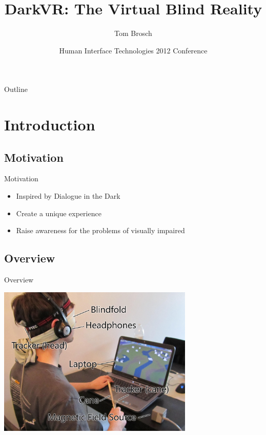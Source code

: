 \documentclass{beamer}
\title{DarkVR: The Virtual Blind Reality}
\author{Tom Brosch}
\institute[Universities of British Columbia]
{
Electrical and Computer Engineering\\
University of British Columbia
}
\date{Human Interface Technologies 2012 Conference}
\begin{document}
\begin{frame}
\titlepage
\end{frame}

\begin{frame}{Outline}
\tableofcontents
\end{frame}


\section{Introduction}

\subsection{Motivation}

\begin{frame}{Motivation}

\begin{itemize}
  \item Inspired by Dialogue in the Dark
  \item Create a unique experience
  \item Raise awareness for the problems of visually impaired
\end{itemize}

\end{frame}


\subsection{Overview}

\begin{frame}{Overview}

\begin{center}
\includegraphics[width=0.7\textwidth]{images/details2}
\end{center}

\end{frame}
\end{document}
